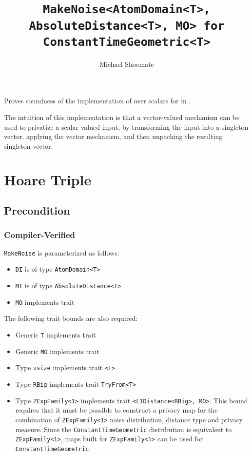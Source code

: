 \documentclass{article}
\title{\texttt{MakeNoise<AtomDomain<T>, AbsoluteDistance<T>, MO> for ConstantTimeGeometric<T>}}
\author{Michael Shoemate}
\date{}
\begin{document}
\maketitle

\contrib
Proves soundness of the implementation of  over scalars
for  in .

The intuition of this implementation is that a vector-valued mechanism can be used to privatize a scalar-valued input,
by transforming the input into a singleton vector, 
applying the vector mechanism, and then unpacking the resulting singleton vector.

\section{Hoare Triple}
\subsection*{Precondition}
\subsubsection*{Compiler-Verified}

\texttt{MakeNoise} is parameterized as follows:
\begin{itemize}
    \item \texttt{DI} is of type \texttt{AtomDomain<T>}
    \item \texttt{MI} is of type \texttt{AbsoluteDistance<T>}
    \item \texttt{MO} implements trait 
\end{itemize}

The following trait bounds are also required:
\begin{itemize}
    \item Generic \texttt{T} implements trait 
    \item Generic \texttt{MO} implements trait 
    \item Type \texttt{usize} implements trait \texttt{<T>}
    \item Type \texttt{RBig} implements trait \texttt{TryFrom<T>}
    \item Type \texttt{ZExpFamily<1>} implements trait \texttt{<L1Distance<RBig>, MO>}.
        This bound requires that it must be possible to construct a privacy map for the combination of \texttt{ZExpFamily<1>} noise distribution, distance type and privacy measure.
        Since the \texttt{ConstantTimeGeometric} distribution is equivalent to \texttt{ZExpFamily<1>},
        maps built for \texttt{ZExpFamily<1>} can be used for \texttt{ConstantTimeGeometric}.
\end{itemize}
\end{document}

